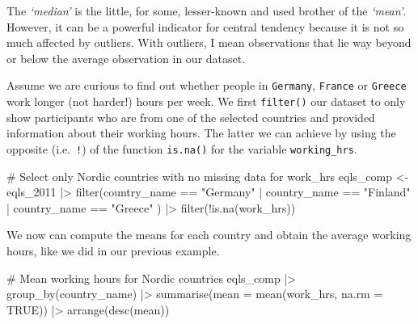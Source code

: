 \documentclass[
  letterpaper,
  DIV=11,
  numbers=noendperiod]{scrreprt}
\newenvironment{Shaded}{\begin{snugshade}}{\end{snugshade}}
\newcommand{\AttributeTok}[1]{\textcolor[rgb]{0.40,0.45,0.13}{#1}}
\newcommand{\CommentTok}[1]{\textcolor[rgb]{0.37,0.37,0.37}{#1}}
\newcommand{\ConstantTok}[1]{\textcolor[rgb]{0.56,0.35,0.01}{#1}}
\newcommand{\FunctionTok}[1]{\textcolor[rgb]{0.28,0.35,0.67}{#1}}
\newcommand{\NormalTok}[1]{\textcolor[rgb]{0.00,0.23,0.31}{#1}}
\newcommand{\OtherTok}[1]{\textcolor[rgb]{0.00,0.23,0.31}{#1}}
\newcommand{\SpecialCharTok}[1]{\textcolor[rgb]{0.37,0.37,0.37}{#1}}
\newcommand{\StringTok}[1]{\textcolor[rgb]{0.13,0.47,0.30}{#1}}
\begin{document}
The \emph{`median'} is the little, for some, lesser-known and used
brother of the \emph{`mean'}. However, it can be a powerful indicator
for central tendency because it is not so much affected by outliers.
With outliers, I mean observations that lie way beyond or below the
average observation in our dataset.

Assume we are curious to find out whether people in \texttt{Germany},
\texttt{France} or \texttt{Greece} work longer (not harder!) hours per
week. We first \texttt{filter()} our dataset to only show participants
who are from one of the selected countries and provided information
about their working hours. The latter we can achieve by using the
opposite (i.e.~\texttt{!}) of the function \texttt{is.na()} for the
variable \texttt{working\_hrs}.

\begin{Shaded}
\begin{Highlighting}[]
\CommentTok{\# Select only Nordic countries with no missing data for \textquotesingle{}work\_hrs\textquotesingle{}}
\NormalTok{eqls\_comp }\OtherTok{\textless{}{-}} 
\NormalTok{  eqls\_2011 }\SpecialCharTok{|\textgreater{}}
  \FunctionTok{filter}\NormalTok{(country\_name }\SpecialCharTok{==} \StringTok{"Germany"} \SpecialCharTok{|}
\NormalTok{         country\_name }\SpecialCharTok{==} \StringTok{"Finland"} \SpecialCharTok{|}
\NormalTok{         country\_name }\SpecialCharTok{==} \StringTok{"Greece"}
\NormalTok{          ) }\SpecialCharTok{|\textgreater{}}
  \FunctionTok{filter}\NormalTok{(}\SpecialCharTok{!}\FunctionTok{is.na}\NormalTok{(work\_hrs))}
\end{Highlighting}
\end{Shaded}

We now can compute the means for each country and obtain the average
working hours, like we did in our previous example.

\begin{Shaded}
\begin{Highlighting}[]
\CommentTok{\# Mean working hours for Nordic countries}
\NormalTok{eqls\_comp }\SpecialCharTok{|\textgreater{}}
  \FunctionTok{group\_by}\NormalTok{(country\_name) }\SpecialCharTok{|\textgreater{}}
  \FunctionTok{summarise}\NormalTok{(}\AttributeTok{mean =} \FunctionTok{mean}\NormalTok{(work\_hrs, }\AttributeTok{na.rm =} \ConstantTok{TRUE}\NormalTok{)) }\SpecialCharTok{|\textgreater{}}
  \FunctionTok{arrange}\NormalTok{(}\FunctionTok{desc}\NormalTok{(mean))}
\end{Highlighting}
\end{Shaded}
\end{document}
